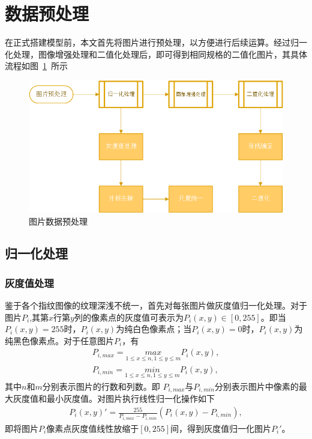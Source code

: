\documentclass{whutmod}
\begin{document}
	\section{数据预处理}
在正式搭建模型前，本文首先将图片进行预处理，以方便进行后续运算。经过归一化处理，图像增强处理和二值化处理后，即可得到相同规格的二值化图片，其具体流程如图~\ref{dfsg}~所示
\begin{figure}[H]
	\centering
	\includegraphics[width=.9\textwidth]{figures/chou4.png}
	\caption{图片数据预处理}\label{dfsg}
\end{figure}   
\subsection{归一化处理}
\subsubsection{灰度值处理}
鉴于各个指纹图像的纹理深浅不统一，首先对每张图片做灰度值归一化处理。对于图片$P_{i}$,其第$x$行第$y$列的像素点的灰度值可表示为$P_{i}(x,y)\in[0,255]$。即当$P_{i}(x,y)=255$时，$P_{i}(x,y)$为纯白色像素点；当$P_{i}(x,y)=0$时，$P_{i}(x,y)$为纯黑色像素点。对于任意图片$P_{i}$，有
\begin{gather*}
	P_{i,max}=\underset{1\leqslant x\leqslant n,1\leqslant y \leqslant  m}{max}P_{i}(x,y),\\
	P_{i,min}=\underset{1\leqslant x\leqslant n,1\leqslant y \leqslant  m}{min}P_{i}(x,y),
\end{gather*}
其中$n$和$m$分别表示图片的行数和列数。即	$P_{i,max}$与$P_{i,min}$分别表示图片中像素的最大灰度值和最小灰度值。对图片执行线性归一化操作如下
\begin{gather*}
	P_i(x,y)'=\frac{255}{P_{i,max}-P_{i,min}}(P_i(x,y)-P_{i,min}),
\end{gather*}
即将图片$P_i$像素点灰度值线性放缩于$[0,255]$间，得到灰度值归一化图片$P_i'$。
\end{document}
